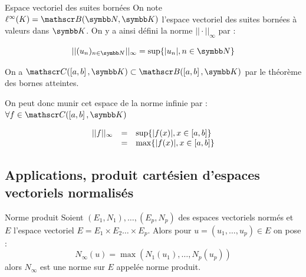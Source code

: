 \begin{definition}{Espace vectoriel des suites bornées}{}
    On note $\ell^\infty(K) = \mathscr B(\N, \K)$ l'espace vectoriel des suites bornées
    à valeurs dans $\K$. On y a ainsi défini la norme $|| \cdot ||_\infty$ par :

    \[||(u_n)_{n \in \N} ||_\infty = \sup\{|u_n|, n \in \N\}\]
\end{definition}

\begin{definition}{}{}
    On a $\mathscr C(\inter{a}{b}, \K) \subset \mathscr B(\inter{a}{b}, \K)$
    par le théorème des bornes atteintes. 

    On peut donc munir cet espace de la norme infinie par : 
    $\forall f \in \mathscr C(\inter{a}{b}, \K)$

    \[
    \begin{array}{rcl}
        ||f ||_\infty & =& \sup\{|f(x)|, x \in \left[a, b\right]\} \\
        \space & = & \max\{|f(x)|, x \in \left[a, b\right]\} \\
    \end{array}
    \]
\end{definition}

\subsection{Applications, produit cartésien d'espaces vectoriels normalisés}

\begin{theoreme}{Norme produit}{}
    Soient $(E_1, N_1), \dots, (E_p, N_p)$ des espaces vectoriels normés
    et $E$ l'espace vectoriel $E = E_1 \times E_2 \dots \times E_p$.
    Alors pour $u = (u_1, \dots, u_p) \in E$ on pose :
    \[N_\infty(u) = \max(N_1(u_1), \dots, N_p(u_p))\]
    alors $N_\infty$ est une norme sur $E$ appelée norme produit. 
\end{theoreme}

